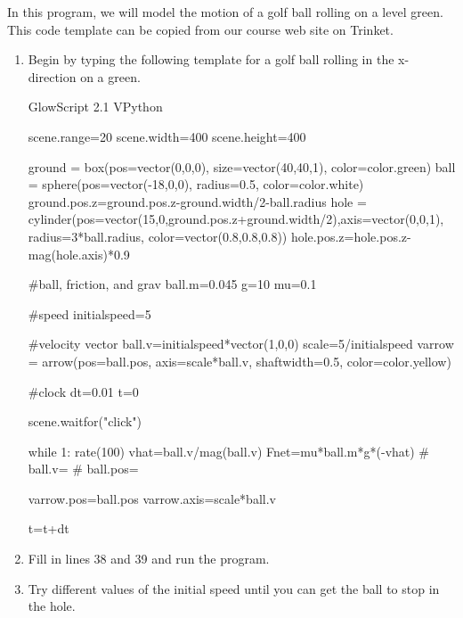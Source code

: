 \procedure

In this program, we will model the motion of a golf ball rolling on a level green. This code template can be copied from our course web site on Trinket.

\begin{enumerate}

\item Begin by typing the following template for a golf ball rolling in the x-direction on a green.

\begin{vpythonblock}
GlowScript 2.1 VPython

scene.range=20
scene.width=400
scene.height=400

ground = box(pos=vector(0,0,0), size=vector(40,40,1), color=color.green)
ball = sphere(pos=vector(-18,0,0), radius=0.5, color=color.white)
ground.pos.z=ground.pos.z-ground.width/2-ball.radius
hole = cylinder(pos=vector(15,0,ground.pos.z+ground.width/2),axis=vector(0,0,1), radius=3*ball.radius, color=vector(0.8,0.8,0.8))
hole.pos.z=hole.pos.z-mag(hole.axis)*0.9

#ball, friction, and grav
ball.m=0.045
g=10
mu=0.1

#speed
initialspeed=5

#velocity vector
ball.v=initialspeed*vector(1,0,0)
scale=5/initialspeed
varrow = arrow(pos=ball.pos, axis=scale*ball.v, shaftwidth=0.5, color=color.yellow)


#clock
dt=0.01
t=0

scene.waitfor("click")

while 1:
        rate(100)
        vhat=ball.v/mag(ball.v)
        Fnet=mu*ball.m*g*(-vhat)
#        ball.v=
#        ball.pos=
        
        varrow.pos=ball.pos
        varrow.axis=scale*ball.v

        t=t+dt
\end{vpythonblock}

\item Fill in lines 38 and 39 and run the program.





\item Try different values of the initial speed until you can get the ball to stop in the hole.


\end{enumerate}

